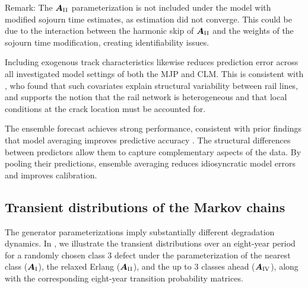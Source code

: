 Remark: The $\bm{A}_{\RN{2}}$ parameterization is not included under the model with modified sojourn time estimates, as estimation did not converge. This could be due to the interaction between the harmonic skip of $\bm{A}_{\RN{2}}$ and the weights of the sojourn time modification, creating identifiability issues.

Including exogenous track characteristics likewise reduces prediction error across all investigated model settings of both the MJP and CLM. This is consistent with \citet{bisgaard2024A}, who found that such covariates explain structural variability between rail lines, and supports the notion that the rail network is heterogeneous and that local conditions at the crack location must be accounted for.

The ensemble forecast achieves strong performance, consistent with prior findings that model averaging improves predictive accuracy \citep{wu2021a}. The structural differences between predictors allow them to capture complementary aspects of the data. By pooling their predictions, ensemble averaging reduces idiosyncratic model errors and improves calibration.
 


\FloatBarrier
 
  
 

\subsection{Transient distributions of the Markov chains} \label{sec:results_transient_dist_markov}
The generator parameterizations imply substantially different degradation dynamics.
In , %
we illustrate the transient distributions over an eight-year period for a randomly chosen class $3$ defect
under the parameterization of the nearest class ($\bm{A}_{\RN{1}}$), the relaxed Erlang ($\bm{A}_{\RN{2}}$), and the up to 3 classes ahead ($\bm{A}_{\RN{4}}$), 
along with the corresponding eight-year transition probability matrices.


